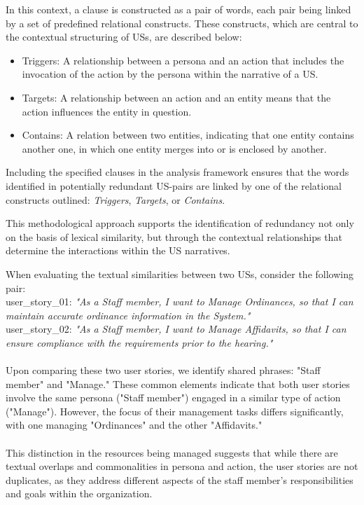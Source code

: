 \begin{definition}
	In this context, a clause is constructed as a pair of words, each pair being linked by a set of predefined relational constructs. These constructs, which are central to the contextual structuring of USs, are described below:
	\begin{itemize}
		
		\item Triggers: A relationship between a persona and an action that includes the invocation of the action by the persona within the narrative of a US.
		
		\item Targets: A relationship between an action and an entity means that the action influences the entity in question.
		
		\item Contains: A relation between two entities, indicating that one entity contains another one, in which one entity merges into or is enclosed by another. 
		
	\end{itemize}
	Including the specified clauses in the analysis framework ensures that the words identified in potentially redundant US-pairs are linked by one of the relational constructs outlined: \textit{Triggers}, \textit{Targets}, or \textit{Contains}. 
	
	This methodological approach supports the identification of redundancy not only on the basis of lexical similarity, but through the contextual relationships that determine the interactions within the US narratives.
\end{definition}
\begin{example}
	When evaluating the textual similarities between two USs, consider the following pair: \\
	user\_story\_01: \textit{"As a Staff member, I want to Manage Ordinances, so that I can maintain accurate ordinance information in the System."}\\
	user\_story\_02: \textit{"As a Staff member, I want to Manage Affidavits, so that I can ensure compliance with the requirements prior to the hearing."} \\\\
	Upon comparing these two user stories, we identify shared phrases: "Staff member" and "Manage." These common elements indicate that both user stories involve the same persona ("Staff member") engaged in a similar type of action ("Manage"). However, the focus of their management tasks differs significantly, with one managing "Ordinances" and the other "Affidavits."\\\\
	This distinction in the resources being managed suggests that while there are textual overlaps and commonalities in persona and action, the user stories are not duplicates, as they address different aspects of the staff member's responsibilities and goals within the organization.
\end{example}
